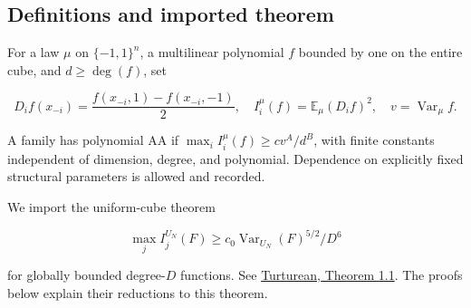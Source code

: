 \subsection{Definitions and imported
theorem}\label{proof:positive_structure:definitions-and-imported-theorem}

For a law \(\mu\) on \(\{-1,1\}^n\), a multilinear polynomial \(f\)
bounded by one on the entire cube, and \(d\ge \operatorname{deg}(f)\),
set

\[
D_if(x_{-i})=\frac{f(x_{-i},1)-f(x_{-i},-1)}2,
\quad I_i^\mu(f)=\mathbb{E}_\mu(D_if)^2,
\quad v=\operatorname{Var}_\mu f.
\]

A family has polynomial AA if \(\max _i I_i^\mu (f)\ge c v^A/d^B\), with
finite constants independent of dimension, degree, and polynomial.
Dependence on explicitly fixed structural parameters is allowed and
recorded.

We import the uniform-cube theorem

\[
\max_j I_j^{U_N}(F)\ge c_0\operatorname{Var}_{U_N}(F)^{5/2}/D^6
\tag{UAA}
\]

for globally bounded degree-\(D\) functions. See
\href{https://arxiv.org/abs/2611.09773}{Turturean, Theorem 1.1}. The
proofs below explain their reductions to this theorem.
